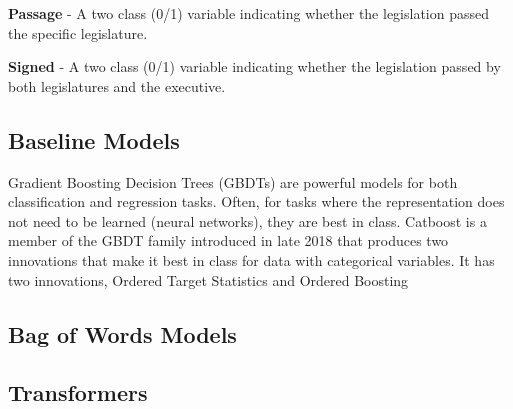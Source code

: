 \documentclass[11pt]{article}
\begin{document}
\textbf{Passage} - A two class (0/1) variable indicating whether the legislation passed the specific legislature. 

\textbf{Signed} - A two class (0/1) variable indicating whether the legislation passed by both legislatures and the executive.

\subsection{Baseline Models}

Gradient Boosting Decision Trees (GBDTs) are powerful models for both classification and regression tasks. Often, for tasks where the representation does not
need to be learned (neural networks), they are best in class. Catboost is a member of the GBDT family introduced in late 2018 that produces two innovations
that make it best in class for data with categorical variables. It has two innovations, Ordered Target Statistics and Ordered Boosting

\subsection{Bag of Words Models}

\subsection{Transformers}






\end{document}
